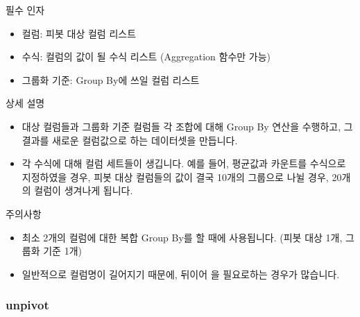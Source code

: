 \documentclass[letterpaper,10pt,english]{sphinxmanual}
\begin{document}
필수 인자
\begin{itemize}
\item {} 
컬럼: 피봇 대상 컬럼 리스트

\item {} 
수식: 컬럼의 값이 될 수식 리스트 (Aggregation 함수만 가능)

\item {} 
그룹화 기준: Group By에 쓰일 컬럼 리스트

\end{itemize}

상세 설명
\begin{itemize}
\item {} 
대상 컬럼들과 그룹화 기준 컬럼들 각 조합에 대해 Group By 연산을 수행하고, 그 결과를 새로운 컬럼값으로 하는 데이터셋을 만듭니다.

\item {} 
각 수식에 대해 컬럼 세트들이 생깁니다. 예를 들어, 평균값과 카운트를 수식으로 지정하였을 경우, 피봇 대상 컬럼들의 값이 결국 10개의 그룹으로 나뉠 경우, 20개의 컬럼이 생겨나게 됩니다.

\end{itemize}

주의사항
\begin{itemize}
\item {} 
최소 2개의 컬럼에 대한 복합 Group By를 할 때에 사용됩니다. (피봇 대상 1개, 그룹화 기준 1개)

\item {} 
일반적으로 컬럼명이 길어지기 때문에, 뒤이어 을 필요로하는 경우가 많습니다.
\begin{quote}

\begin{figure}[H]
\centering

\noindent{}
\end{figure}
\end{quote}

\end{itemize}


\subsubsection{unpivot}
\label{\detokenize{discovery/part07/rule_kinds:unpivot}}
\begin{figure}[H]
\centering

\noindent{}
\end{figure}
\end{document}
